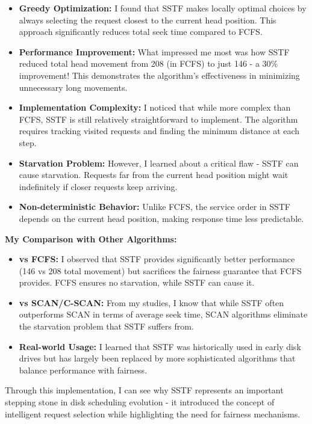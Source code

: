 \documentclass[12pt,a4paper]{article}
\begin{document}
\begin{itemize}
    \item \textbf{Greedy Optimization:} I found that SSTF makes locally optimal choices by always selecting the request closest to the current head position. This approach significantly reduces total seek time compared to FCFS.
    \item \textbf{Performance Improvement:} What impressed me most was how SSTF reduced total head movement from 208 (in FCFS) to just 146 - a 30\% improvement! This demonstrates the algorithm's effectiveness in minimizing unnecessary long movements.
    \item \textbf{Implementation Complexity:} I noticed that while more complex than FCFS, SSTF is still relatively straightforward to implement. The algorithm requires tracking visited requests and finding the minimum distance at each step.
    \item \textbf{Starvation Problem:} However, I learned about a critical flaw - SSTF can cause starvation. Requests far from the current head position might wait indefinitely if closer requests keep arriving.
    \item \textbf{Non-deterministic Behavior:} Unlike FCFS, the service order in SSTF depends on the current head position, making response time less predictable.
\end{itemize}

\textbf{My Comparison with Other Algorithms:}
\begin{itemize}
    \item \textbf{vs FCFS:} I observed that SSTF provides significantly better performance (146 vs 208 total movement) but sacrifices the fairness guarantee that FCFS provides. FCFS ensures no starvation, while SSTF can cause it.
    \item \textbf{vs SCAN/C-SCAN:} From my studies, I know that while SSTF often outperforms SCAN in terms of average seek time, SCAN algorithms eliminate the starvation problem that SSTF suffers from.
    \item \textbf{Real-world Usage:} I learned that SSTF was historically used in early disk drives but has largely been replaced by more sophisticated algorithms that balance performance with fairness.
\end{itemize}

Through this implementation, I can see why SSTF represents an important stepping stone in disk scheduling evolution - it introduced the concept of intelligent request selection while highlighting the need for fairness mechanisms.
\end{document}
